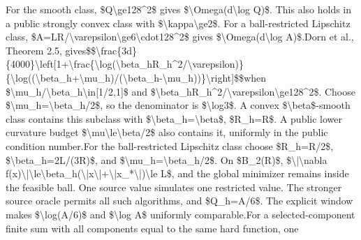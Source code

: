 \documentclass[10pt,a4paper]{article}
\begin{document}
\begingroup\raggedright\sloppy For the smooth class,\allowbreak{} \$Q\textbackslash{}ge128\textasciicircum{}2\$ gives \$\textbackslash{}Omega(d\textbackslash{}log Q)\$. This also holds in a public strongly convex class with \$\textbackslash{}kappa\textbackslash{}ge2\$. For a ball-restricted Lipschitz class,\allowbreak{} \$A=\allowbreak{}LR/\allowbreak{}\textbackslash{}varepsilon\textbackslash{}ge6\textbackslash{}cdot128\textasciicircum{}2\$ gives \$\textbackslash{}Omega(d\textbackslash{}log A)\$.\newline{}\newline{}Dorn et al.,\allowbreak{} Theorem 2.5,\allowbreak{} gives\newline{}\$\$\textbackslash{}frac\{3d\}\{4000\}\textbackslash{}left[1+\textbackslash{}frac\{\textbackslash{}log(\textbackslash{}beta\_\allowbreak{}hR\_\allowbreak{}h\textasciicircum{}2/\allowbreak{}\textbackslash{}varepsilon)\}\{\textbackslash{}log((\textbackslash{}beta\_\allowbreak{}h+\textbackslash{}mu\_\allowbreak{}h)/\allowbreak{}(\textbackslash{}beta\_\allowbreak{}h-\textbackslash{}mu\_\allowbreak{}h))\}\textbackslash{}right]\$\$\newline{}when \$\textbackslash{}mu\_\allowbreak{}h/\allowbreak{}\textbackslash{}beta\_\allowbreak{}h\textbackslash{}in[1/\allowbreak{}2,\allowbreak{}1]\$ and \$\textbackslash{}beta\_\allowbreak{}hR\_\allowbreak{}h\textasciicircum{}2/\allowbreak{}\textbackslash{}varepsilon\textbackslash{}ge128\textasciicircum{}2\$. Choose \$\textbackslash{}mu\_\allowbreak{}h=\allowbreak{}\textbackslash{}beta\_\allowbreak{}h/\allowbreak{}2\$,\allowbreak{} so the denominator is \$\textbackslash{}log3\$. A convex \$\textbackslash{}beta\$-smooth class contains this subclass with \$\textbackslash{}beta\_\allowbreak{}h=\allowbreak{}\textbackslash{}beta\$,\allowbreak{} \$R\_\allowbreak{}h=\allowbreak{}R\$. A public lower curvature budget \$\textbackslash{}mu\textbackslash{}le\textbackslash{}beta/\allowbreak{}2\$ also contains it,\allowbreak{} uniformly in the public condition number.\newline{}\newline{}For the ball-restricted Lipschitz class choose \$R\_\allowbreak{}h=\allowbreak{}R/\allowbreak{}2\$,\allowbreak{} \$\textbackslash{}beta\_\allowbreak{}h=\allowbreak{}2L/\allowbreak{}(3R)\$,\allowbreak{} and \$\textbackslash{}mu\_\allowbreak{}h=\allowbreak{}\textbackslash{}beta\_\allowbreak{}h/\allowbreak{}2\$. On \$B\_\allowbreak{}2(R)\$,\allowbreak{} \$\textbackslash{}|\textbackslash{}nabla f(x)\textbackslash{}|\textbackslash{}le\textbackslash{}beta\_\allowbreak{}h(\textbackslash{}|x\textbackslash{}|+\textbackslash{}|x\_\allowbreak{}*\textbackslash{}|)\textbackslash{}le L\$,\allowbreak{} and the global minimizer remains inside the feasible ball. One source value simulates one restricted value. The stronger source oracle permits all such algorithms,\allowbreak{} and \$Q\_\allowbreak{}h=\allowbreak{}A/\allowbreak{}6\$. The explicit window makes \$\textbackslash{}log(A/\allowbreak{}6)\$ and \$\textbackslash{}log A\$ uniformly comparable.\newline{}\newline{}For a selected-component finite sum with all components equal to the same hard function,\allowbreak{} one 
\end{document}
